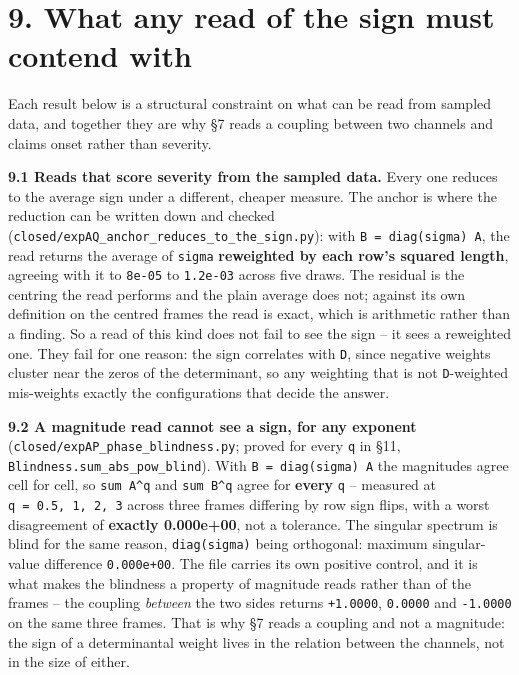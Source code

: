 \documentclass[10pt,letterpaper,twocolumn]{article}
\begin{document}
\section{9. What any read of the sign must contend with}\label{9-what-any-read-of-the-sign-must-contend-with}

Each result below is a structural constraint on what can be read from sampled data, and together
they are why §7 reads a coupling between two channels and claims onset rather than severity.

\textbf{9.1 Reads that score severity from the sampled data.} Every one reduces to the average sign
under a different, cheaper measure. The anchor is where the reduction can be written down and
checked (\texttt{closed/\allowbreak{}expAQ\_\allowbreak{}anchor\_\allowbreak{}reduces\_\allowbreak{}to\_\allowbreak{}the\_\allowbreak{}sign.\allowbreak{}py}): with \texttt{B\ =\allowbreak{}\ diag(\allowbreak{}sigma)\allowbreak{}\ A}, the read returns
the average of \texttt{sigma} \textbf{reweighted by each row's squared length}, agreeing with it to \texttt{8e-{}\allowbreak{}05} to
\texttt{1.\allowbreak{}2e-{}\allowbreak{}03} across five draws. The residual is the centring the read performs and the plain average
does not; against its own definition on the centred frames the read is exact, which is arithmetic
rather than a finding. So a read of this kind does not fail to see the sign -- it sees a reweighted
one. They fail for one reason: the sign correlates
with \texttt{\textbar{}\allowbreak{}D\textbar{}\allowbreak{}}, since negative weights cluster near the zeros of the determinant, so any weighting that
is not \texttt{\textbar{}\allowbreak{}D\textbar{}\allowbreak{}}-weighted mis-weights exactly the configurations that decide the answer.

\textbf{9.2 A magnitude read cannot see a sign, for any exponent}
(\texttt{closed/\allowbreak{}expAP\_\allowbreak{}phase\_\allowbreak{}blindness.\allowbreak{}py}; proved for every \texttt{q} in §11, \texttt{Blindness.\allowbreak{}sum\_\allowbreak{}abs\_\allowbreak{}pow\_\allowbreak{}blind}).
With \texttt{B\ =\allowbreak{}\ diag(\allowbreak{}sigma)\allowbreak{}\ A} the magnitudes agree cell for cell,
so \texttt{sum\ \textbar{}\allowbreak{}A\textbar{}\allowbreak{}\^{}q} and \texttt{sum\ \textbar{}\allowbreak{}B\textbar{}\allowbreak{}\^{}q} agree for \textbf{every} \texttt{q} -- measured at \texttt{q\ =\allowbreak{}\ 0.\allowbreak{}5,\allowbreak{}\ 1,\allowbreak{}\ 2,\allowbreak{}\ 3} across
three frames differing by row sign flips, with a worst disagreement of \textbf{exactly 0.000e+00}, not a
tolerance. The singular spectrum is blind for the same reason, \texttt{diag(\allowbreak{}sigma)\allowbreak{}} being orthogonal:
maximum singular-value difference \texttt{0.\allowbreak{}000e+\allowbreak{}00}. The file carries its own positive control, and it is
what makes the blindness a property of magnitude reads rather than of the frames -- the coupling
\emph{between} the two sides returns \texttt{+\allowbreak{}1.\allowbreak{}0000}, \texttt{0.\allowbreak{}0000} and \texttt{-{}\allowbreak{}1.\allowbreak{}0000} on the same three frames. That is
why §7 reads a coupling and not a magnitude: the sign of a determinantal weight lives in the
relation between the channels, not in the size of either.
\end{document}
